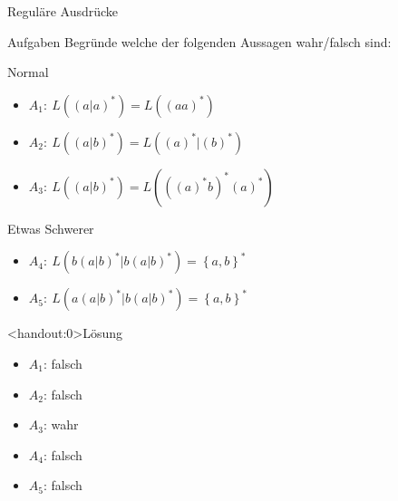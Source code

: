 {
\begin{frame}{Reguläre Ausdrücke}
    \begin{alertblock}{Aufgaben}
        Begründe welche der folgenden Aussagen wahr/falsch sind:
    \end{alertblock}
    \begin{block}{Normal}
        \begin{itemize}
            \item $A_1:\ L\left(\left(a|a\right)^*\right) = L\left(\left(aa\right)^*\right)$
            \item $A_2:\ L\left(\left(a|b\right)^*\right) = L\left(\left(a\right)^*|\left(b\right)^*\right)$
            \item $A_3:\ L\left(\left(a|b\right)^*\right) = L\left(\left(\left(a\right)^*b\right)^*\left(a\right)^*\right)$
        \end{itemize}
    \end{block}
    \begin{block}{Etwas Schwerer}
        \begin{itemize}
            \item $A_4:\ L\left(b\left(a|b\right)^*|b\left(a|b\right)^*\right) = \left\{a,b\right\}^*$
            \item $A_5:\ L\left(a\left(a|b\right)^*|b\left(a|b\right)^*\right) = \left\{a,b\right\}^*$
        \end{itemize}
    \end{block}
\end{frame}
}

{
\begin{frame}<handout:0>{Lösung}
    \begin{itemize}[<+- | alert@+>]
        \item $A_1$: falsch
        \item $A_2$: falsch
        \item $A_3$: wahr
        \item $A_4$: falsch
        \item $A_5$: falsch
    \end{itemize}
\end{frame}
}

%
%


